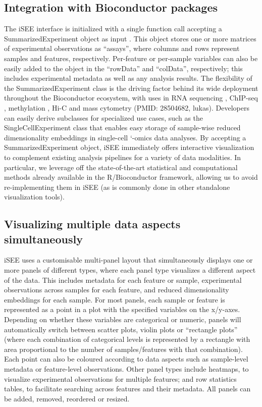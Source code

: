\documentclass{bioinfo}
\begin{document}
\subsection{Integration with Bioconductor packages} 
The iSEE interface is initialized with a single function call accepting a SummarizedExperiment object as input \citep{huber2015orchestrating}.
This object stores one or more matrices of experimental observations as ``assays'', where columns and rows represent samples and features, respectively. 
Per-feature or per-sample variables can also be easily added to the object in the ``rowData'' and ``colData'', respectively; this includes experimental metadata as well as any analysis results. 
The flexibility of the SummarizedExperiment class is the driving factor behind its wide deployment throughout the Bioconductor ecosystem, with uses in RNA sequencing \citep{love2014moderated}, ChIP-seq \citep{lun2016csaw}, methylation \citep{aryee2014minfi}, Hi-C \citep{lun2016infrastructure} and mass cytometry (PMID: 28504682, lukas). 
Developers can easily derive subclasses for specialized use cases, such as the SingleCellExperiment class that enables easy storage of sample-wise reduced dimensionality embeddings in single-cell `-omics data analyses. 
By accepting a SummarizedExperiment object, iSEE immediately offers interactive visualization to complement existing analysis pipelines for a variety of data modalities. 
In particular, we leverage off the state-of-the-art statistical and computational methods already available in the R/Bioconductor framework, allowing us to avoid re-implementing them in iSEE (as is commonly done in other standalone visualization tools).

\subsection{Visualizing multiple data aspects simultaneously}
iSEE uses a customisable multi-panel layout that simultaneously displays one or more panels of different types, where each panel type visualizes a different aspect of the data. 
This includes metadata for each feature or sample, experimental observations across samples for each feature, and reduced dimensionality embeddings for each sample. 
For most panels, each sample or feature is represented as a point in a plot with the specified variables on the x/y-axes.
Depending on whether these variables are categorical or numeric, panels will automatically switch between scatter plots, violin plots or ``rectangle plots'' (where each combination of categorical levels is represented by a rectangle with area proportional to the number of samples/features with that combination). 
Each point can also be coloured according to data aspects such as sample-level metadata or feature-level observations. 
Other panel types include heatmaps, to visualize experimental observations for multiple features; and row statistics tables, to facilitate searching across features and their metadata.
All panels can be added, removed, reordered or resized.
\end{document}
